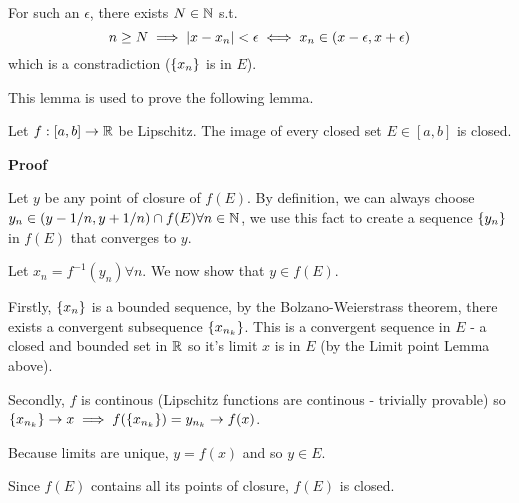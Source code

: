 For such an $\epsilon$, there exists $N\in \mathbb{N}$ s.t.
\[n\geq N \implies \left|x-x_n\right| < \epsilon \iff x_n \in (x-\epsilon, x+\epsilon)\]
which is a constradiction ($\left\{x_n\right\}$ is in $E$).

This lemma is used to prove the following lemma.

\begin{lem}
   Let $f: [a,b]\to \mathbb{R}$ be Lipschitz. The image of every closed set $E\in [a,b]$ is closed.
\end{lem}
\textbf{Proof}

Let $y$ be any point of closure of $f(E)$. 
By definition, we can always choose $y_n \in (y-1/n, y+1/n) \cap f(E) \forall n\in\mathbb{N}$, we use this fact to create a sequence $\left\{y_n\right\}$ in $f(E)$ that converges to $y$.

Let $x_n = f^{-1}(y_n) \forall n$. We now show that $y \in f(E)$.

Firstly, $\left\{x_n\right\}$ is a bounded sequence, by the Bolzano-Weierstrass theorem, there exists a convergent subsequence $\left\{x_{n_k}\right\}$.
This is a convergent sequence in $E$ - a closed and bounded set in $\mathbb{R}$ so it's limit $x$ is in $E$ (by the Limit point Lemma above).

Secondly, $f$ is continous (Lipschitz functions are continous - trivially provable) so $\left\{x_{n_k}\right\} \to x \implies f(\left\{x_{n_k}\right\}) = y_{n_k} \to f(x)$.

Because limits are unique, $y = f(x)$ and so $y\in E$.

Since $f(E)$ contains all its points of closure, $f(E)$ is closed.

\bigskip

